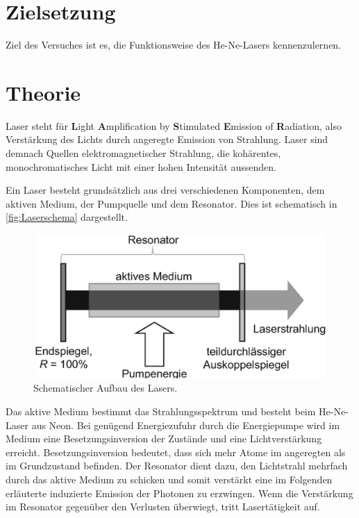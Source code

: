\section{Zielsetzung}
\label{sec:Zielsetzung}
Ziel des Versuches ist es, die Funktionsweise des He-Ne-Lasers kennenzulernen.

\section{Theorie}
\label{sec:Theorie}

Laser steht für \textbf{L}ight \textbf{A}mplification by \textbf{S}timulated \textbf{E}mission of \textbf{R}adiation, also
Verstärkung des Lichts durch angeregte Emission von Strahlung.
Laser sind demnach Quellen elektromagnetischer Strahlung, die kohärentes, monochromatisches Licht mit einer hohen Intensität aussenden.


Ein Laser besteht grundsätzlich aus drei verschiedenen Komponenten, dem aktiven Medium, der Pumpquelle und dem Resonator.
Dies ist schematisch in \autoref{fig:Laserschema} dargestellt.\\

\begin{figure}[H]
    \centering
    \includegraphics[scale=0.7]{Abbildungen/schemalaser.png}
    \caption{Schematischer Aufbau des Lasers.\cite{Gerhard2020}}
    \label{fig:Laserschema}
\end{figure}

Das aktive Medium bestimmt das Strahlungsspektrum und besteht beim He-Ne-Laser aus Neon.
Bei genügend Energiezufuhr durch die Energiepumpe wird im Medium eine Besetzungsinversion der Zustände und eine Lichtverstärkung erreicht.
Besetzungsinversion bedeutet, dass sich mehr Atome im angeregten als im Grundzustand befinden.
Der Resonator dient dazu, den Lichtstrahl mehrfach durch das aktive Medium zu schicken und somit verstärkt eine im Folgenden erläuterte
induzierte Emission der Photonen zu erzwingen.
Wenn die Verstärkung im Resonator gegenüber den Verlusten überwiegt, tritt Lasertätigkeit auf.\\

